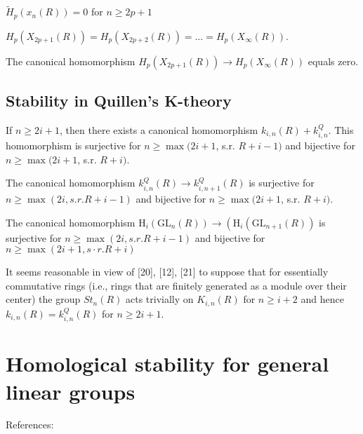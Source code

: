 \begin{theo}
$\tilde{H}_p\left(x_n(R)\right)=0$ for $n \geq 2 p+1$    
\end{theo}

\begin{coro}
    $H_p\left(X_{2 p+1}(R)\right)=H_p\left(X_{2 p+2}(R)\right)=\ldots=H_p\left(X_{\infty}(R)\right)$.
\end{coro}

\begin{coro}
The canonical homomorphism $H_p\left(X_{2 p+1}(R)\right) \rightarrow H_p\left(X_{\infty}(R)\right)$ equals zero.    
\end{coro}

\section{Stability in Quillen's K-theory}

\begin{theo}
If $n \geq 2 i+1$, then there exists a canonical homomorphism
    $k_{i, n}(R)+k_{i, n}^Q$. This homomorphism is surjective for
    $n \geq \max (2 i+1$, s.r. $R+i-1)$ and bijective for $n \geq \max (2 i+1$, s.r. $R+i)$.    
\end{theo}

\begin{theo}
The canonical homomorphism $k_{i, n}^Q(R) \rightarrow k_{i, n+1}^Q(R)$ is surjective for $n \geq \max (2 i, s . r . R+i-1)$ and bijective for $n \geq \max (2 i+1$, s.r. $R+i)$.
\end{theo}

\begin{coro}
The canonical homomorphism $\mathrm{H}_i\left(\mathrm{GL}_n(R)\right) \rightarrow\left(\mathrm{H}_i\left(\mathrm{GL}_{n+1}(R)\right)\right.$ is surjective for $n \geq \max (2 i, s . r . R+i-1)$ and bijective for $n \geq \max (2 i+1, s \cdot r . R+i)$
\end{coro}

It seems reasonable in view of [20], [12], [21] to suppose that for essentially commutative rings (i.e., rings that are finitely generated as a module over their center) the group $S t_n(R)$ acts trivially on $K_{i, n}(R)$ for $n \geq i+2$ and hence $k_{i, n}(R)=k_{i, n}^Q(R)$ for $n \geq 2 i+1$.


\chapter{Homological stability for general linear groups}
References:\cite{maazenHomologyStabilityGeneral1979a,suslinStabilityAlgebraicKtheory1982,wilberdvanderkallenHomologyStabilityLinear1980}

